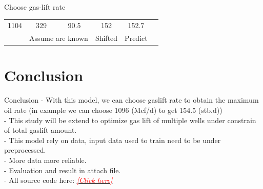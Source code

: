 \documentclass[xcolor=table, 11pt]{beamer}
\begin{document}
\begin{frame}{Choose gas-lift rate}
\begin{table}[]
\begin{tabular}{cccccl}
1104                                                         & 329                                                           & 90.5                                                            & 152                                                          & 152.7                                                       &                              \\ \cline{1-5}
\multicolumn{1}{|l|}{}                                       & \multicolumn{2}{c|}{Assume are known}                                                                                           & \multicolumn{1}{c|}{Shifted}                                 & \multicolumn{1}{c|}{Predict}                                &                              \\ \cline{1-5}
\end{tabular}
\end{table}
\end{frame}
\section{Conclusion}
\begin{frame}{Conclusion}
- With this model, we can choose gaslift rate to obtain the maximum oil rate (in example we can choose 1096 (Mcf/d) to get 154.5 (stb.d))\\
- This study will be extend to optimize gas lift of multiple wells under constrain of total gaslift amount.\\
- This model rely on data, input data used to train need to be under preprocessed.\\
- More data more reliable.\\
- Evaluation and result in attach file.\\
- All source code here: \href{https://nbviewer.jupyter.org/github/YanGBloG/Data-Analysis/blob/a69fc2607dcad85ad33ff300e259fd8b1951c09b/Production\%20forcasting\%20with\%20MLP,\%20LSMT/predict-performance-mlp-gru.ipynb}{\textcolor{red}{\emph{[Click here]}}} 

\end{frame}
\end{document}
